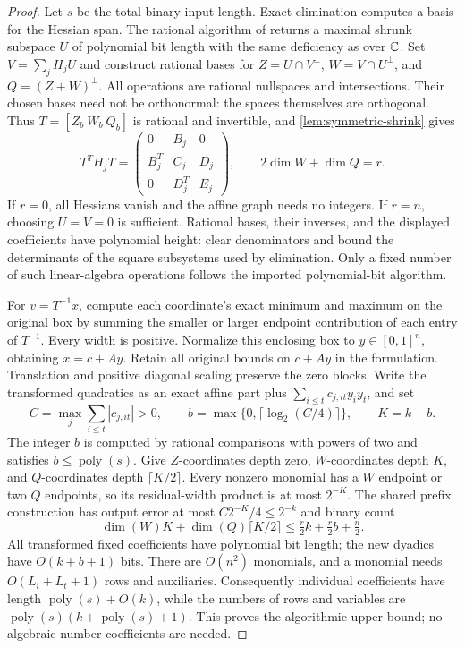 \begin{proof}
Let $s$ be the total binary input length. Exact elimination computes a
basis for the Hessian span. The rational algorithm of
\citet[Theorem 1.5 and Lemma 5.3]{iqs2018} returns a maximal shrunk
subspace $U$ of polynomial bit length with the same deficiency as over
$\mathbb C$. Set $V=\sum_jH_jU$ and construct rational bases for
$Z=U\cap V^\perp$, $W=V\cap U^\perp$, and $Q=(Z+W)^\perp$.
All operations are rational nullspaces and intersections. Their chosen
bases need not be orthonormal: the spaces themselves are orthogonal.
Thus $T=[Z_b\ W_b\ Q_b]$ is rational and invertible, and
\cref{lem:symmetric-shrink} gives
\[
 T^TH_jT=\begin{pmatrix}0&B_j&0\\ B_j^T&C_j&D_j\\0&D_j^T&E_j\end{pmatrix},
 \qquad 2\dim W+\dim Q=r.
\]
If $r=0$, all Hessians vanish and the affine graph needs no integers.
If $r=n$, choosing $U=V=0$ is sufficient. Rational bases, their inverses,
and the displayed coefficients have polynomial height: clear denominators
and bound the determinants of the square subsystems used by elimination.
Only a fixed number of such linear-algebra operations follows the
imported polynomial-bit algorithm.

For $v=T^{-1}x$, compute each coordinate's exact minimum and maximum on
the original box by summing the smaller or larger endpoint contribution
of each entry of $T^{-1}$. Every width is positive. Normalize this enclosing
box to $y\in[0,1]^n$, obtaining $x=c+Ay$. Retain all original bounds
on $c+Ay$ in the formulation. Translation and positive diagonal scaling
preserve the zero blocks. Write the transformed quadratics as an exact
affine part plus $\sum_{i\le t}c_{j,it}y_iy_t$, and set
\[
 C=\max_j\sum_{i\le t}|c_{j,it}|>0,\qquad
 b=\max\{0,\lceil\log_2(C/4)\rceil\},\qquad K=k+b.
\]
The integer $b$ is computed by rational comparisons with powers of two
and satisfies $b\le\operatorname{poly}(s)$. Give $Z$-coordinates depth
zero, $W$-coordinates depth $K$, and $Q$-coordinates depth
$\lceil K/2\rceil$. Every nonzero monomial has a $W$ endpoint or two
$Q$ endpoints, so its residual-width product is at most $2^{-K}$.
The shared prefix construction has output error at most
$C2^{-K}/4\le2^{-k}$ and binary count
\[
 \dim(W)K+\dim(Q)\lceil K/2\rceil
 \le\tfrac r2 k+\tfrac r2 b+\tfrac n2.
\]
All transformed fixed coefficients have polynomial bit length; the
new dyadics have $O(k+b+1)$ bits. There are $O(n^2)$ monomials, and a
monomial needs $O(L_i+L_t+1)$ rows and auxiliaries. Consequently individual
coefficients have length $\operatorname{poly}(s)+O(k)$, while the numbers
of rows and variables are
$\operatorname{poly}(s)(k+\operatorname{poly}(s)+1)$. This proves the
algorithmic upper bound; no algebraic-number coefficients are needed.


\end{proof}

